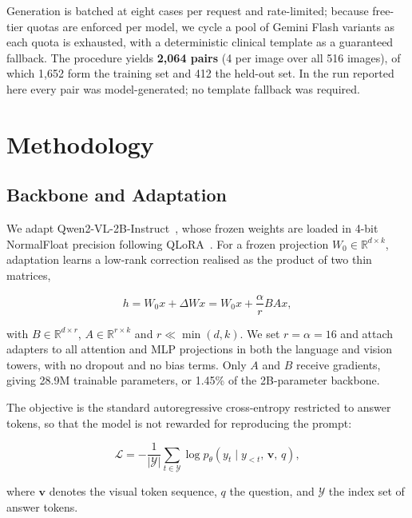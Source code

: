\documentclass[conference]{IEEEtran}
\begin{document}
Generation is batched at eight cases per request and rate-limited; because
free-tier quotas are enforced per model, we cycle a pool of Gemini Flash variants
as each quota is exhausted, with a deterministic clinical template as a
guaranteed fallback. The procedure yields \textbf{2{,}064 pairs}
(4 per image over all 516 images), of which 1{,}652 form the training set and 412
the held-out set. In the run reported here every pair was model-generated; no
template fallback was required.

\section{Methodology}
\label{sec:method}

\subsection{Backbone and Adaptation}
We adapt Qwen2-VL-2B-Instruct~\cite{wang2024qwen2vl}, whose frozen weights are
loaded in 4-bit NormalFloat precision following QLoRA~\cite{dettmers2023qlora}.
For a frozen projection $W_0 \in \mathbb{R}^{d \times k}$, adaptation learns a
low-rank correction realised as the product of two thin matrices,

\begin{equation}
h = W_0 x + \Delta W x = W_0 x + \frac{\alpha}{r} B A x,
\label{eq:lora}
\end{equation}

with $B \in \mathbb{R}^{d \times r}$, $A \in \mathbb{R}^{r \times k}$ and
$r \ll \min(d,k)$. We set $r = \alpha = 16$ and attach adapters to all attention
and MLP projections in both the language and vision towers, with no dropout and
no bias terms. Only $A$ and $B$ receive gradients, giving 28.9M trainable
parameters, or 1.45\% of the 2B-parameter backbone.

The objective is the standard autoregressive cross-entropy restricted to answer
tokens, so that the model is not rewarded for reproducing the prompt:

\begin{equation}
\mathcal{L} = -\frac{1}{|\mathcal{Y}|}
\sum_{t \in \mathcal{Y}} \log p_\theta\!\left(y_t \mid y_{<t},\, \mathbf{v},\, q\right),
\label{eq:loss}
\end{equation}

where $\mathbf{v}$ denotes the visual token sequence, $q$ the question, and
$\mathcal{Y}$ the index set of answer tokens.
\end{document}
